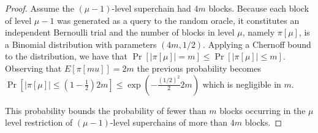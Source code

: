 \begin{proof}
    Assume the $(\mu - 1)$-level superchain had $4m$ blocks. Because each block
    of level $\mu - 1$ was generated as a query to the random oracle, it
    constitutes an independent Bernoulli trial and the number of blocks in
    level $\mu$, namely $\pi[\mu]$, is a Binomial distribution with parameters
    $(4m, 1/2)$. Applying a Chernoff bound to the
    distribution, we have that $\Pr[|\pi[\mu]| = m] \leq \Pr[|\pi[\mu]| \leq
    m]$. Observing that $E[\pi[mu]] = 2m$ the previous probability becomes
    $\Pr[|\pi[\mu]| \leq (1 - \frac{1}{2})2m] \leq \exp(-\frac{(1/2)^2}{2} 2m)$
    which is negligible in $m$.

    This probability bounds the probability of fewer
    than $m$ blocks occurring in the $\mu$ level restriction of $(\mu -
    1)$-level superchains of more than $4m$ blocks.
\end{proof}
